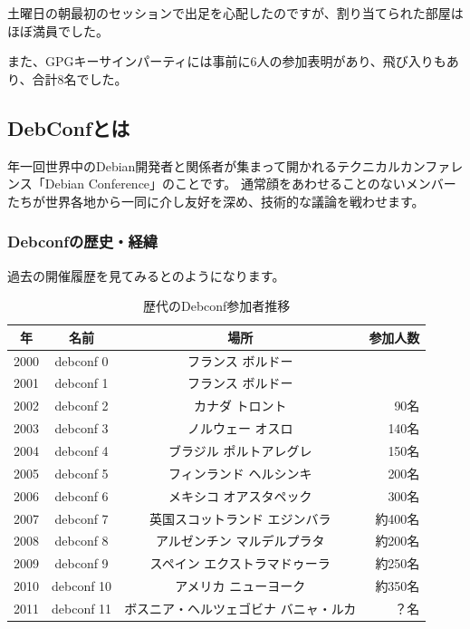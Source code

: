 \documentclass[mingoth,a4paper]{jsarticle}
\begin{document}
土曜日の朝最初のセッションで出足を心配したのですが、割り当てられた部屋はほぼ満員でした。

また、GPGキーサインパーティには事前に6人の参加表明があり、飛び入りもあり、合計8名でした。

\label{sec:debconfreportsummary}

\subsection{DebConfとは}
年一回世界中のDebian開発者と関係者が集まって開かれるテクニカルカンファレンス「Debian Conference」のことです。
通常顔をあわせることのないメンバーたちが世界各地から一同に介し友好を深め、技術的な議論を戦わせます。

\subsubsection{Debconfの歴史・経緯}
過去の開催履歴を見てみるとのようになります。

\begin{table}[H]
\caption{歴代のDebconf参加者推移}
\label{tab:debconflist}
 \begin{center}
 {\footnotesize
 \begin{tabular}{|c|c|c|r|}
 \hline
 年 & 名前 & 場所 & 参加人数 \\
 \hline
 2000 & debconf 0 &フランス ボルドー & \\
 2001 & debconf 1 &フランス ボルドー & \\
 2002 & debconf 2 &カナダ トロント & 90名 \\
 2003 & debconf 3 &ノルウェー オスロ & 140名 \\
 2004 & debconf 4 &ブラジル ポルトアレグレ &  150名 \\
 2005 & debconf 5 &フィンランド ヘルシンキ & 200名 \\
 2006 & debconf 6 &メキシコ オアスタペック & 300名 \\
 2007 & debconf 7 &英国スコットランド エジンバラ & 約400名 \\
 2008 & debconf 8 &アルゼンチン マルデルプラタ & 約200名 \\               
 2009 & debconf 9 &スペイン エクストラマドゥーラ & 約250名 \\
 2010 & debconf 10 &アメリカ ニューヨーク & 約350名 \\
 2011 & debconf 11 &ボスニア・ヘルツェゴビナ バニャ・ルカ & ？名\\
 \hline
 \end{tabular}
 }
 \end{center}
\end{table}
\end{document}

